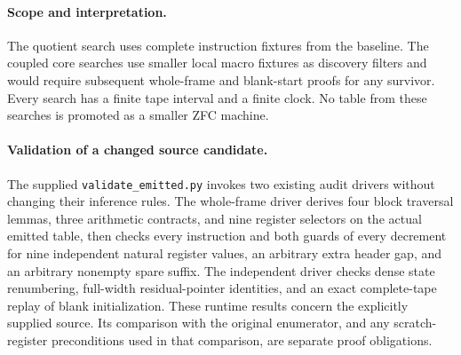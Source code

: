 \paragraph{Scope and interpretation.}
The quotient search uses complete instruction fixtures from the baseline.
The coupled core searches use smaller local macro fixtures as discovery
filters and would require subsequent whole-frame and blank-start proofs for
any survivor. Every search has a finite tape interval and a finite clock.
No table from these searches is promoted as a smaller ZFC machine.

\paragraph{Validation of a changed source candidate.}
The supplied \texttt{validate\_emitted.py} invokes two existing audit drivers
without changing their inference rules. The whole-frame driver derives four
block traversal lemmas, three arithmetic contracts, and nine register selectors
on the actual emitted table, then checks every instruction and both guards
of every decrement for nine independent natural register values, an arbitrary
extra header gap, and an arbitrary nonempty spare suffix. The independent
driver checks dense state renumbering, full-width residual-pointer identities,
and an exact complete-tape replay of blank initialization. These runtime
results concern the explicitly supplied source. Its comparison with the
original enumerator, and any scratch-register preconditions used in that
comparison, are separate proof obligations.
